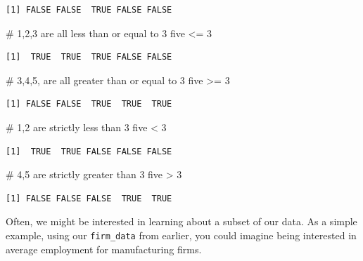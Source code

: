 \documentclass[
  letterpaper,
  DIV=11,
  numbers=noendperiod]{scrreprt}
\newenvironment{Shaded}{\begin{snugshade}}{\end{snugshade}}
\newcommand{\CommentTok}[1]{\textcolor[rgb]{0.37,0.37,0.37}{#1}}
\newcommand{\DecValTok}[1]{\textcolor[rgb]{0.68,0.00,0.00}{#1}}
\newcommand{\NormalTok}[1]{\textcolor[rgb]{0.00,0.23,0.31}{#1}}
\newcommand{\SpecialCharTok}[1]{\textcolor[rgb]{0.37,0.37,0.37}{#1}}
\begin{document}
\begin{verbatim}
[1] FALSE FALSE  TRUE FALSE FALSE
\end{verbatim}

\begin{Shaded}
\begin{Highlighting}[]
\CommentTok{\# 1,2,3 are all less than or equal to 3}
\NormalTok{five }\SpecialCharTok{\textless{}=} \DecValTok{3}
\end{Highlighting}
\end{Shaded}

\begin{verbatim}
[1]  TRUE  TRUE  TRUE FALSE FALSE
\end{verbatim}

\begin{Shaded}
\begin{Highlighting}[]
\CommentTok{\# 3,4,5, are all greater than or equal to 3}
\NormalTok{five }\SpecialCharTok{\textgreater{}=} \DecValTok{3}
\end{Highlighting}
\end{Shaded}

\begin{verbatim}
[1] FALSE FALSE  TRUE  TRUE  TRUE
\end{verbatim}

\begin{Shaded}
\begin{Highlighting}[]
\CommentTok{\# 1,2 are strictly less than 3}
\NormalTok{five }\SpecialCharTok{\textless{}} \DecValTok{3}
\end{Highlighting}
\end{Shaded}

\begin{verbatim}
[1]  TRUE  TRUE FALSE FALSE FALSE
\end{verbatim}

\begin{Shaded}
\begin{Highlighting}[]
\CommentTok{\# 4,5 are strictly greater than 3}
\NormalTok{five }\SpecialCharTok{\textgreater{}} \DecValTok{3}
\end{Highlighting}
\end{Shaded}

\begin{verbatim}
[1] FALSE FALSE FALSE  TRUE  TRUE
\end{verbatim}

Often, we might be interested in learning about a subset of our data. As
a simple example, using our \texttt{firm\_data} from earlier, you could
imagine being interested in average employment for manufacturing firms.
\end{document}
